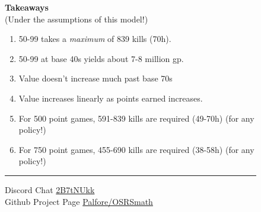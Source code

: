 \documentclass[]{article}
\newcommand{\lcol}{0.15}
\begin{document}
\begin{figure}[b]
		    \vspace{5mm}
		    \centering
		    \LARGE{\textbf{Takeaways}}\\
		    \large
			\centering
			(Under the assumptions of this model!)
		    \begin{enumerate}
		    \centering	
		    	\item 50-99 takes a \emph{maximum} of 839 kills (70h).
		    	\item 50-99 at base 40s yields about 7-8 million gp.
		    	\item Value doesn't increase much past base 70s
		    	\item Value increases linearly as points earned increases.
		    	\item For 500 point games, 591-839 kills are required (49-70h) (for any policy!)
		    	\item For 750 point games, 455-690 kills are required (38-58h) (for any policy!)
		    \end{enumerate}
		\vspace{5mm}
		\hrule
		\vspace{5mm}
		\Large

		Discord Chat {\HUGE \faDiscord}  \href{https://discord.gg/2B7tNUkk}{2B7tNUkk}\phantom{...}\\
		Github Project Page {\HUGE \faGithub} \href{https://github.com/Palfore/OSRSmath}{Palfore/OSRSmath}\\
		
		

	\end{figure}
\end{document}
